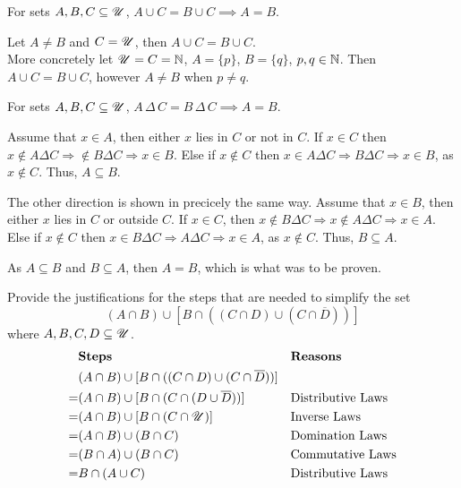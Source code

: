 \documentclass[a4paper, english, 12pt]{article} %
\begin{document}
\begin{subproblem}[2]
  For sets $A, B, C \subseteq \mathscr{U}$, $A \cup C = B \cup C \implies A = B$.
\end{subproblem}

\begin{answer}
  Let $A \neq B$ and $C = \mathscr{U}$, then $A \cup C = B \cup C$.\\
  More concretely let $\mathscr{U} = C = \mathbb{N}$, $A = \{p\}$, $B = \{q\}$, $p,q \in \mathbb{N}$. Then
  $A \cup C = B \cup C$, however $A \neq B$ when $p \neq q$. 
\end{answer}

\begin{subproblem}[4]
  For sets $A, B, C \subseteq \mathscr{U}$, $A\,\Delta\,C = B\,\Delta\,C \implies A
  = B$.
\end{subproblem}
%
\begin{answer}
  Assume that $x \in A$, then either $x$ lies in $C$ or not in $C$. If
  $x \in C$ then $x \not \in A \Delta C \Rightarrow \not \in B \Delta C
  \Rightarrow x \in B$. Else if $x \not\in C$ then $x \in A \Delta C \Rightarrow B
  \Delta C \Rightarrow x \in B$, as $x \not \in C$. Thus, $A \subseteq B$.


  The other direction is shown in precicely the same way. 
  Assume that $x \in B$, then either $x$ lies in $C$ or outside $C$. If $x \in
  C$, then $x \not \in B \Delta C \Rightarrow x \not \in A \Delta C \Rightarrow x
  \in A$. Else if $x \not \in C$ then $x \in B \Delta C \Rightarrow A \Delta C
  \Rightarrow x \in A$, as $x \not \in C$. Thus, $B \subseteq A$.

  As $A \subseteq B$ and $B \subseteq A$, then $A = B$, which is what was to be proven.
\end{answer}

\begin{problem}[16]
  Provide the justifications for the steps that are needed to simplify the set
  \begin{equation*}
    (A \cap B) \cup [ B \cap ((C \cap D) \cup (C \cap \overline{D})) ]
  \end{equation*}
  where $A, B, C, D \subseteq \mathscr{U}$.
  \begin{align*}
      & \textbf{Steps} && \textbf{Reasons} \\
      & (A \cap B) \cup [ B \cap ((C \cap D) \cup (C \cap \overline{D})) ]
      && \ans{} \\
    = & (A \cap B) \cup [B \cap (C \cap (D \cup \overline{D}))]
      && \ans{\text{Distributive Laws}} \\
    = & (A \cap B) \cup [B \cap (C \cap \U)]
      && \ans{\text{Inverse Laws}}\\
    = & (A \cap B) \cup (B \cap C)
      && \ans{\text{Domination Laws}}\\ 
    = & (B \cap A) \cup (B \cap C)
      && \ans{\text{Commutative Laws}}\\
    = & B \cap (A \cup C)
      && \ans{\text{Distributive Laws}}
\end{align*}
%
\end{problem}
\end{document}
